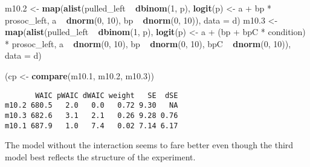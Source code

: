\documentclass[]{tufte-handout}
\newenvironment{Shaded}{}{}
\newcommand{\KeywordTok}[1]{\textcolor[rgb]{0.00,0.44,0.13}{\textbf{#1}}}
\newcommand{\DataTypeTok}[1]{\textcolor[rgb]{0.56,0.13,0.00}{#1}}
\newcommand{\DecValTok}[1]{\textcolor[rgb]{0.25,0.63,0.44}{#1}}
\newcommand{\FloatTok}[1]{\textcolor[rgb]{0.25,0.63,0.44}{#1}}
\newcommand{\StringTok}[1]{\textcolor[rgb]{0.25,0.44,0.63}{#1}}
\newcommand{\OperatorTok}[1]{\textcolor[rgb]{0.40,0.40,0.40}{#1}}
\newcommand{\NormalTok}[1]{#1}
\begin{document}
\begin{Shaded}
\begin{Highlighting}[]
\NormalTok{m10}\FloatTok{.2}\NormalTok{ <-}\StringTok{ }\KeywordTok{map}\NormalTok{(}\KeywordTok{alist}\NormalTok{(pulled_left }\OperatorTok{~}\StringTok{ }\KeywordTok{dbinom}\NormalTok{(}\DecValTok{1}\NormalTok{, p), }
    \KeywordTok{logit}\NormalTok{(p) <-}\StringTok{ }\NormalTok{a }\OperatorTok{+}\StringTok{ }\NormalTok{bp }\OperatorTok{*}\StringTok{ }\NormalTok{prosoc_left, a }\OperatorTok{~}\StringTok{ }\KeywordTok{dnorm}\NormalTok{(}\DecValTok{0}\NormalTok{, }
        \DecValTok{10}\NormalTok{), bp }\OperatorTok{~}\StringTok{ }\KeywordTok{dnorm}\NormalTok{(}\DecValTok{0}\NormalTok{, }\DecValTok{10}\NormalTok{)), }\DataTypeTok{data =}\NormalTok{ d)}
\NormalTok{m10}\FloatTok{.3}\NormalTok{ <-}\StringTok{ }\KeywordTok{map}\NormalTok{(}\KeywordTok{alist}\NormalTok{(pulled_left }\OperatorTok{~}\StringTok{ }\KeywordTok{dbinom}\NormalTok{(}\DecValTok{1}\NormalTok{, p), }
    \KeywordTok{logit}\NormalTok{(p) <-}\StringTok{ }\NormalTok{a }\OperatorTok{+}\StringTok{ }\NormalTok{(bp }\OperatorTok{+}\StringTok{ }\NormalTok{bpC }\OperatorTok{*}\StringTok{ }\NormalTok{condition) }\OperatorTok{*}\StringTok{ }\NormalTok{prosoc_left, }
\NormalTok{    a }\OperatorTok{~}\StringTok{ }\KeywordTok{dnorm}\NormalTok{(}\DecValTok{0}\NormalTok{, }\DecValTok{10}\NormalTok{), bp }\OperatorTok{~}\StringTok{ }\KeywordTok{dnorm}\NormalTok{(}\DecValTok{0}\NormalTok{, }\DecValTok{10}\NormalTok{), bpC }\OperatorTok{~}\StringTok{ }
\StringTok{        }\KeywordTok{dnorm}\NormalTok{(}\DecValTok{0}\NormalTok{, }\DecValTok{10}\NormalTok{)), }\DataTypeTok{data =}\NormalTok{ d)}

\NormalTok{(cp <-}\StringTok{ }\KeywordTok{compare}\NormalTok{(m10}\FloatTok{.1}\NormalTok{, m10}\FloatTok{.2}\NormalTok{, m10}\FloatTok{.3}\NormalTok{))}
\end{Highlighting}
\end{Shaded}

\begin{verbatim}
       WAIC pWAIC dWAIC weight   SE  dSE
m10.2 680.5   2.0   0.0   0.72 9.30   NA
m10.3 682.6   3.1   2.1   0.26 9.28 0.76
m10.1 687.9   1.0   7.4   0.02 7.14 6.17
\end{verbatim}

The model without the interaction seems to fare better even though the
third model best reflects the structure of the experiment.

\begin{Shaded}
\end{Shaded}
\end{document}
